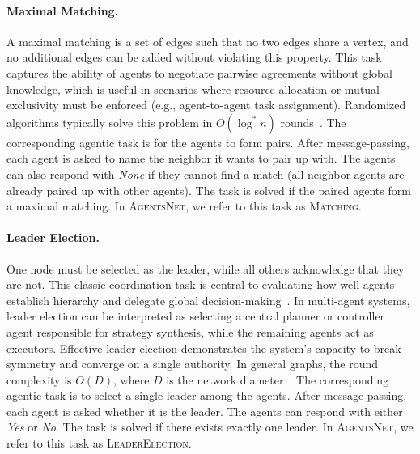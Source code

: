 \documentclass{article}
\newcommand{\benchmark}{\textsc{AgentsNet}}
\begin{document}
\paragraph{Maximal Matching.} A maximal matching is a set of edges such that no two edges share a vertex, and no additional edges can be added without violating this property. This task captures the ability of agents to negotiate pairwise agreements without global knowledge, which is useful in scenarios where resource allocation or mutual exclusivity must be enforced (e.g., agent-to-agent task assignment).
Randomized algorithms typically solve this problem in $O(\log^* n)$ rounds~\cite{peleg2000distributed}.  The corresponding agentic task is for the agents to form pairs. After message-passing, each agent is asked to name the neighbor it wants to pair up with. The agents can also respond with \textit{None} if they cannot find a match (all neighbor agents are already paired up with other agents). The task is solved if the paired agents form a maximal matching.
In \benchmark{}, we refer to this task as \textsc{Matching}.

\paragraph{Leader Election.} One node must be selected as the leader, while all others acknowledge that they are not. This classic coordination task is central to evaluating how well agents establish hierarchy and delegate global decision-making~\citep{angluin1980local}.
In multi-agent systems, leader election can be interpreted as selecting a central planner or controller agent responsible for strategy synthesis, while the remaining agents act as executors. Effective leader election demonstrates the system's capacity to break symmetry and converge on a single authority. In general graphs, the round complexity is $O(D)$, where $D$ is the network diameter~\cite{lynch1996distributed}. The corresponding agentic task is to select a single leader among the agents. After message-passing, each agent is asked whether it is the leader. The agents can respond with either \textit{Yes} or \textit{No}. The task is solved if there exists exactly one leader.
In \benchmark{}, we refer to this task as \textsc{LeaderElection}.
\end{document}
